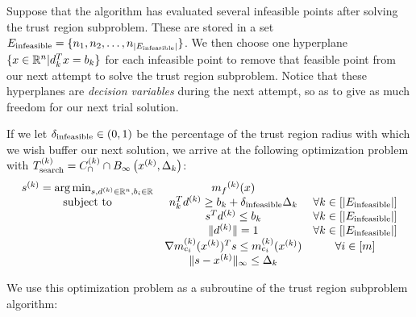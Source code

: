 Suppose that the algorithm has evaluated several infeasible points after solving the trust region subproblem.
These are stored in a set ${E_\textrm{infeasible}} = \{n_1, n_2, \ldots, n_{|{E_\textrm{infeasible}}|}\}$.
We then choose one hyperplane $\{x \in \mathbb R^n | d_k^Tx = b_k\}$ for each infeasible point to remove that feasible point from our next attempt to solve the trust region subproblem.
Notice that these hyperplanes are \emph{decision variables} during the next attempt, so as to give as much freedom for our next trial solution.

If we let ${\delta_\textrm{infeasible}} \in (0, 1)$ be the percentage of the trust region radius with which we wish buffer our next solution, 
we arrive at the following optimization problem with ${T_{\text{search}}^{(k)}} = {C^{(k)}_{\cap}} \cap { B_{\infty}\left(x^{(k)}, \Delta_k\right) } $:
\begin{align}
\label{buffered_trust_region_subproblem}
\begin{array}{ccc}
{{s}^{(k)}} = \operatorname*{arg\,min}_{s, d^{(k)} \in \mathbb R^n, b_i \in \mathbb R}	& {{m}_f}^{(k)}(x) & 	\\
 \mbox{subject to}  & n_k^Td^{(k)} \ge b_k + {\delta_\textrm{infeasible}} \Delta_k& \forall k \in \left[ |{E_\textrm{infeasible}} |\right] \\
 & s^T d^{(k)} \le b_k &   \forall k \in \left[|{E_\textrm{infeasible}} |\right]  \\
 & \|d^{(k)}\| = 1 & \forall k \in \left[|{E_\textrm{infeasible}} |	\right]\\
 & \nabla {{m}^{(k)}_{c_i}}(x^{(k)}) ^T s \le {{m}^{(k)}_{c_i}}(x^{(k)}) & \forall i \in [m] \\
 & \|s - x^{(k)} \|_{\infty} \le \Delta_k & \\
\end{array}
\end{align}

We use this optimization problem as a subroutine of the trust region subproblem algorithm:

